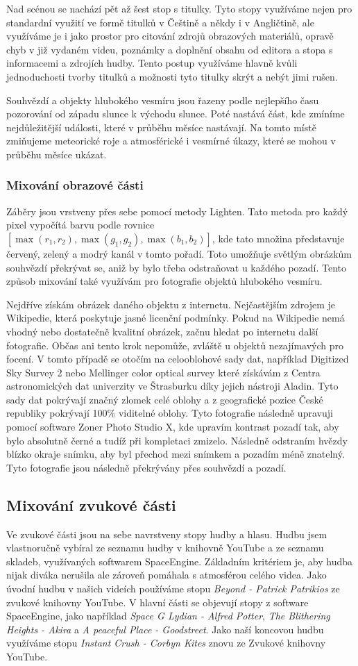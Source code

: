 \documentclass[12pt,a4paper,titlepage]{article}
\begin{document}
Nad scénou se nachází pět až šest stop s titulky. Tyto stopy využíváme nejen pro standardní využití ve formě titulků v Češtině a někdy i v Angličtině, ale využíváme je i jako prostor pro citování zdrojů obrazových materiálů, opravě chyb v již vydaném videu, poznámky a doplnění obsahu od editora a stopa s informacemi a zdrojích hudby. Tento postup využíváme hlavně kvůli jednoduchosti tvorby titulků a možnosti tyto titulky skrýt a nebýt jimi rušen. 

Souhvězdí a objekty hlubokého vesmíru jsou řazeny podle nejlepšího času pozorování od západu slunce k východu slunce. Poté nastává část, kde zmíníme nejdůležitější události, které v průběhu měsíce nastávají. Na tomto místě zmiňujeme meteorické roje a atmosférické i vesmírné úkazy, které se mohou v průběhu měsíce ukázat.
\subsubsection{Mixování obrazové části}
Záběry jsou vrstveny přes sebe pomocí metody Lighten. Tato metoda pro každý pixel vypočítá barvu podle rovnice $[\max(r_1, r_2), \max(g_1, g_2), \max(b_1, b_2)]$, kde tato množina představuje červený, zelený a modrý kanál v tomto pořadí. Toto umožňuje světlým obrázkům souhvězdí překrývat se, aniž by bylo třeba odstraňovat u každého pozadí. Tento způsob mixování také využívám pro fotografie objektů hlubokého vesmíru. 

Nejdříve získám obrázek daného objektu z internetu. Nejčastějším zdrojem je Wikipedie, která poskytuje jasné licenční podmínky. Pokud na Wikipedie nemá vhodný nebo dostatečně kvalitní obrázek, začnu hledat po internetu další fotografie. Občas ani tento krok nepomůže, zvláště u objektů nezajímavých pro focení. V tomto případě se otočím na celooblohové sady dat, například Digitized Sky Survey 2 nebo Mellinger color optical survey které získávám z Centra astronomických dat univerzity ve Štrasburku díky jejich nástroji Aladin. Tyto sady dat pokrývají značný zlomek celé oblohy a z geografické pozice České republiky pokrývají 100\% viditelné oblohy. Tyto fotografie následně upravuji pomocí software Zoner Photo Studio X, kde upravím kontrast pozadí tak, aby bylo absolutně černé a tudíž při kompletaci zmizelo. Následně odstraním hvězdy blízko okraje snímku, aby byl přechod mezi snímkem a pozadím méně znatelný. Tyto fotografie jsou následně překrývány přes souhvězdí a pozadí. 
\subsection{Mixování zvukové části}
Ve zvukové části jsou na sebe navrstveny stopy hudby a hlasu. Hudbu jsem vlastnoručně vybíral ze seznamu hudby v knihovně YouTube a ze seznamu skladeb, využívaných softwarem SpaceEngine. Základním kritériem je, aby hudba nijak diváka nerušila ale zároveň pomáhala s atmosférou celého videa. Jako úvodní hudbu v našich videích používáme stopu \textit{Beyond - Patrick Patrikios} ze zvukové knihovny YouTube. V hlavní části se objevují stopy z software SpaceEngine, jako například \textit{Space G Lydian - Alfred Potter}, \textit{The Blithering Heights - Akira} a \textit{A peaceful Place - Goodstreet}. Jako naší koncovou hudbu využíváme stopu \textit{Instant Crush - Corbyn Kites} znovu ze Zvukové knihovny YouTube.
\end{document}
